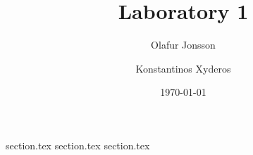 \documentclass[12pt]{article}
\title{Laboratory 1}
\author{
        Olafur Jonsson \\
            \and
        Konstantinos Xyderos \\
}
\date{\today}
\begin{document}
\maketitle

{section.tex}
{section.tex}
{section.tex}
\end{document}
